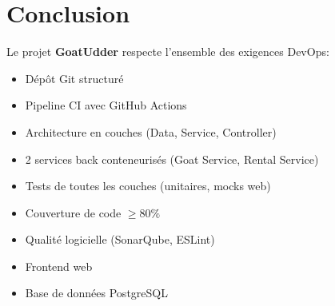 \documentclass[12pt,a4paper]{report}
\begin{document}
\chapter{Conclusion}

Le projet \textbf{GoatUdder} respecte l'ensemble des exigences DevOps:
\begin{itemize}[leftmargin=*]
    \item Dépôt Git structuré
    \item Pipeline CI avec GitHub Actions
    \item Architecture en couches (Data, Service, Controller)
    \item 2 services back conteneurisés (Goat Service, Rental Service)
    \item Tests de toutes les couches (unitaires, mocks web)
    \item Couverture de code $\geq 80\%$
    \item Qualité logicielle (SonarQube, ESLint)
    \item Frontend web
    \item Base de données PostgreSQL
\end{itemize}
\end{document}
